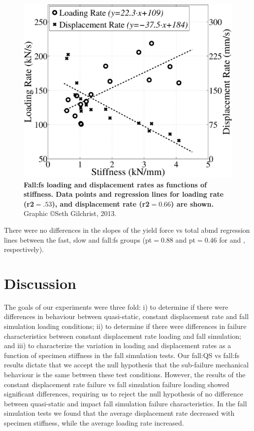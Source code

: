 \begin{figure}
\centering
\includegraphics[width=\linewidth]{./behave_fail/Figures/StiffVsRate_HighRes}
\caption[Stiffness \acs*{vs} loading and displacement rates]{\textbf{Fall:\ac{fs} loading and displacement rates as functions of stiffness. Data points and regression lines for loading rate (\ac{r2}$ = .53$), and displacement rate (\ac{r2}$ = 0.66$) are shown.} Graphic \copyright Seth Gilchrist, 2013.}
\label{fig:StiffVsRate_HighRes}
\end{figure}

There were no differences in the slopes of the yield force \ac{vs} total \ac{abmd} regression lines between the fast, slow and fall:\ac{fs} groups (\ac{pt}$ = 0.88$ and \ac{pt}$ = 0.46$ for \citet{de_bakker_during_2009} and \citet{nishiyama_proximal_2013}, respectively). 

\section{Discussion}
\label{sec:behave_fail_discssion}
The goals of our experiments were three fold: i) to determine if there were differences in behaviour between quasi-static, constant displacement rate and fall simulation loading conditions; ii) to determine if there were differences in failure characteristics between constant displacement rate loading and fall simulation; and iii) to characterize the variation in loading and displacement rates as a function of specimen stiffness in the fall simulation tests.
Our fall:\ac{QS} \ac{vs} fall:\ac{fs} results dictate that we accept the null hypothesis that the sub-failure mechanical behaviour is the same between these test conditions.
However, the results of the constant displacement rate failure \ac{vs} fall simulation failure loading showed significant differences, requiring us to reject the null hypothesis of no difference between quasi-static and impact fall simulation failure characteristics.
In the fall simulation tests we found that the average displacement rate decreased with specimen stiffness, while the average loading rate increased.

